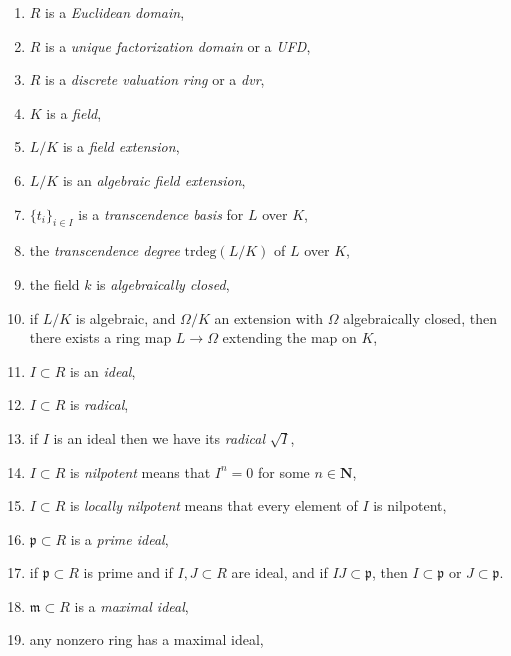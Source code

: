\begin{enumerate}
\item $R$ is a {\it Euclidean domain},
\label{item-ring-Euclidean}
\item $R$ is a {\it unique factorization domain} or a {\it UFD},
\label{item-ring-UFD}
\item $R$ is a {\it discrete valuation ring} or a {\it dvr},
\label{item-ring-dvr}
\item $K$ is a {\it field},
\label{item-field}
\item $L/K$ is a {\it field extension},
\label{item-field-extension}
\item $L/K$ is an {\it algebraic field extension},
\label{item-field-extension-algebraic}
\item $\{t_i\}_{i\in I}$ is a {\it transcendence basis} for $L$ over $K$,
\label{item-transcendence-basis}
\item the {\it transcendence degree} $\text{trdeg}(L/K)$ of $L$ over $K$,
\label{item-transcendence-degree}
\item the field $k$ is {\it algebraically closed},
\label{item-algebraically-closed}
\item
\label{item-extend-into-algebraically-closed}
if $L/K$ is algebraic, and $\Omega/K$ an extension with $\Omega$
algebraically closed,
then there exists a ring map $L \to \Omega$ extending the map on $K$,
\item $I \subset R$ is an {\it ideal},
\label{item-ideal}
\item $I \subset R$ is {\it radical},
\label{item-ideal-radical}
\item if $I$ is an ideal then we have its {\it radical} $\sqrt{I}$,
\label{item-radical-ideal}
\item
\label{item-ideal-nilpotent}
$I \subset R$ is {\it nilpotent} means that $I^n = 0$ for
some $n \in \mathbf{N}$,
\item
\label{item-ideal-locally-nilpotent}
$I \subset R$ is {\it locally nilpotent} means that every
element of $I$ is nilpotent,
\item $\mathfrak p \subset R$ is a {\it prime ideal},
\label{item-prime-ideal}
\item
\label{item-prime-product-ideals}
if $\mathfrak p \subset R$ is prime and if $I, J \subset R$
are ideal, and if $IJ\subset \mathfrak p$, then
$I \subset \mathfrak p$ or $J \subset \mathfrak p$.
\item $\mathfrak m \subset R$ is a {\it maximal ideal},
\label{item-maximal-ideal}
\item any nonzero ring has a maximal ideal,
\label{item-exists-maximal-ideal}

\end{enumerate}
